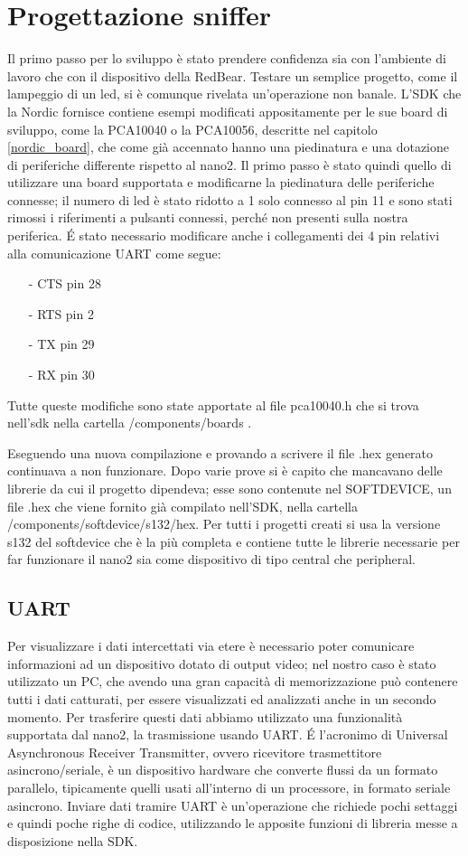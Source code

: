 
\section{Progettazione sniffer}
Il primo passo per lo sviluppo è stato prendere confidenza sia con l'ambiente di lavoro che con il dispositivo della RedBear. Testare un semplice progetto, come il lampeggio di un led, si è comunque rivelata un'operazione non banale.
L'SDK che la Nordic fornisce contiene esempi modificati appositamente per le sue board di sviluppo, come la PCA10040 o la PCA10056, descritte nel capitolo \ref{nordic_board}, che come già accennato hanno una piedinatura e una dotazione di periferiche differente rispetto al nano2. Il primo passo è stato quindi quello di utilizzare una board supportata e modificarne la piedinatura delle periferiche connesse; il numero di led è stato ridotto a 1 solo connesso al pin 11 e sono stati rimossi i riferimenti a pulsanti connessi, perché non presenti sulla nostra periferica. \'E stato necessario modificare anche i collegamenti dei 4 pin relativi alla comunicazione UART come segue:
\begin{itemize}
\item[-] CTS pin 28
\item[-] RTS pin 2
\item[-] TX pin 29
\item[-] RX pin 30
\end{itemize}
Tutte queste modifiche sono state apportate al file pca10040.h che si trova nell'sdk nella cartella /components/boards .

Eseguendo una nuova compilazione e provando a scrivere il file .hex generato continuava a non funzionare. Dopo varie prove si è capito che mancavano delle librerie da cui il progetto dipendeva; esse sono contenute nel SOFTDEVICE, un file .hex che viene fornito già compilato nell'SDK, nella cartella /components/softdevice/s132/hex. Per tutti i progetti creati si usa la versione s132 del softdevice che è la più completa e contiene tutte le librerie necessarie per far funzionare il nano2 sia come dispositivo di tipo central che peripheral.

\subsection{UART}
Per visualizzare i dati intercettati via etere è necessario poter comunicare informazioni ad un dispositivo dotato di output video; nel nostro caso è stato utilizzato un PC, che avendo una gran capacità di memorizzazione può contenere tutti i dati catturati, per essere visualizzati ed analizzati anche in un secondo momento. Per trasferire questi dati abbiamo utilizzato una funzionalità supportata dal nano2, la trasmissione usando UART. \'E l'acronimo di Universal Asynchronous Receiver Transmitter, ovvero ricevitore trasmettitore asincrono/seriale, è un dispositivo hardware che converte flussi da un formato parallelo, tipicamente quelli usati all'interno di un processore, in formato seriale asincrono.
Inviare dati tramire UART è un'operazione che richiede pochi settaggi e quindi poche righe di codice, utilizzando le apposite funzioni di libreria messe a disposizione nella SDK. 

